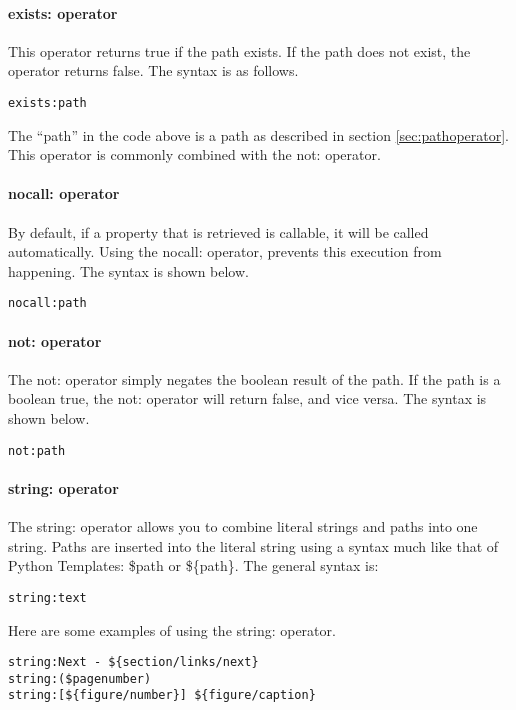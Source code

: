 \paragraph{exists: operator}

This operator returns true if the path exists.  If the path does not exist,
the operator returns false.   The syntax is as follows.
\begin{verbatim}
exists:path
\end{verbatim}

The ``path'' in the code above is a path as described in section 
\ref{sec:pathoperator}.  This operator is commonly combined with the
not: operator.


\paragraph{nocall: operator}

By default, if a property that is retrieved is callable, it will be
called automatically.  Using the nocall: operator, prevents this 
execution from happening.  The syntax is shown below.
\begin{verbatim}
nocall:path
\end{verbatim}


\paragraph{not: operator}

The not: operator simply negates the boolean result of the path.  If
the path is a boolean true, the not: operator will return false, and
vice versa.  The syntax is shown below.
\begin{verbatim}
not:path
\end{verbatim}


\paragraph{string: operator}

The string: operator allows you to combine literal strings and paths
into one string.  Paths are inserted into the literal string using a
syntax much like that of Python Templates: \$path or \$\{path\}.
The general syntax is:
\begin{verbatim}
string:text
\end{verbatim}

Here are some examples of using the string: operator.
\begin{verbatim}
string:Next - ${section/links/next}
string:($pagenumber)
string:[${figure/number}] ${figure/caption}
\end{verbatim}


